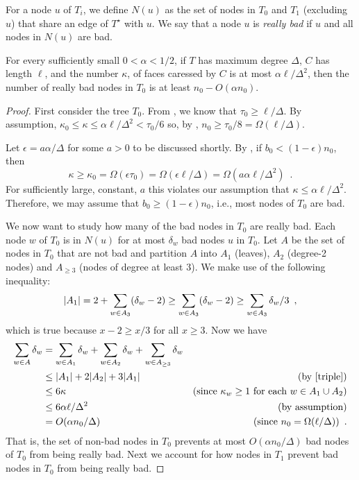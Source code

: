 \documentclass{patmorin}
\newcommand{\dual}[1]{{#1}^\star}
\begin{document}
For a node $u$ of $T_i$, we define $N(u)$ as the set of nodes in $T_0$
and $T_1$ (excluding $u$) that share an edge of $\dual{T}$ with $u$.
We say that a node $u$ is \emph{really bad} if $u$ and all nodes in $N(u)$
are bad.  

\begin{lem}
  For every sufficiently small $0<\alpha < 1/2$,  
  if $T$ has maximum degree $\Delta$, $C$ has length $\ell$, and the number
  $\kappa$, of faces caressed by $C$ is at most $\alpha\ell/\Delta^2$, then
  the number of really bad nodes in $T_0$ is at least $n_0-O(\alpha n_0)$.
\end{lem}

\begin{proof}
  First consider the tree $T_0$.  From ,
  we know that $\tau_0\ge \ell/\Delta$.  By assumption,
  $\kappa_0\le\kappa\le \alpha\ell/\Delta^2 < \tau_0/6$
  so, by , $n_0 \ge
  \tau_0/8=\Omega(\ell/\Delta)$.
  
  Let $\epsilon=a\alpha/\Delta$ for some $a>0$ to be discussed shortly.
  By , if $b_0 < (1-\epsilon) n_0$, then
  \[ 
      \kappa \ge \kappa_0 = \Omega(\epsilon\tau_0)
               = \Omega(\epsilon\ell/\Delta)
               = \Omega(a\alpha\ell/\Delta^2) 
               \enspace .
  \]
  For sufficiently large, constant, $a$ this violates our assumption
  that $\kappa \le \alpha\ell/\Delta^2$.
  Therefore, we may assume that $b_0\ge (1-\epsilon)n_0$, i.e., most nodes
  of $T_0$ are bad.

  We now want to study how many of the bad nodes in $T_0$ are really bad.
  Each node $w$ of $T_0$ is in $N(u)$ for at most $\delta_w$ bad nodes
  $u$ in $T_0$.  Let $A$ be the set of nodes in $T_0$ that are not
  bad and partition $A$ into $A_1$ (leaves), $A_2$ (degree-2 nodes)
  and $A_{\ge 3}$ (nodes of degree at least 3).  We make use of the
  following inequality:
	\begin{equation}
		|A_1| = 2 + \sum_{w\in A_3}(\delta_w-2) \ge \sum_{w\in A_3}(\delta_w-2)
		\ge \sum_{w\in A_3}\delta_w/3 \enspace ,  \eqlabel{triple}
	\end{equation}
  which is true because $x-2\ge x/3$ for all $x\ge 3$. 
  Now we have 
  \begin{align*}
   \sum_{w\in A}\delta_w 
    & = \sum_{w\in A_1}\delta_w 
         + \sum_{w\in A_2}\delta_w 
         + \sum_{w\in A_{\ge 3}}\delta_w \\
	  & \le |A_1| + 2|A_2| + 3|A_1| & \text{(by \eqref{triple})}\\
    & \le 6\kappa & \text{(since $\kappa_w\ge 1$ for each $w\in A_1\cup A_2$)}\\
    & \le 6\alpha\ell/\Delta^2 & \text{(by assumption)}\\
    & = O(\alpha n_0/\Delta) & \text{(since $n_0=\Omega(\ell/\Delta)$)}\enspace .
  \end{align*}
  That is, the set of non-bad nodes in $T_0$ prevents at most $O(\alpha
  n_0/\Delta)$ bad nodes of $T_0$ from being really bad. Next we account
  for how nodes in $T_1$ prevent bad nodes in $T_0$ from being really bad.


\end{proof}
\end{document}

